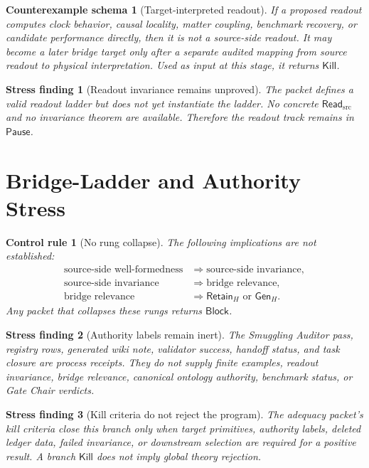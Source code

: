 \documentclass[11pt]{article}
\newcommand{\ReadSrc}{\mathsf{Read}_{\mathrm{src}}}
\newcommand{\RetainH}{\mathsf{Retain}_{H}}
\newcommand{\GenH}{\mathsf{Gen}_{H}}
\newcommand{\Block}{\mathsf{Block}}
\newcommand{\Pause}{\mathsf{Pause}}
\newcommand{\Kill}{\mathsf{Kill}}
\newtheorem{stressfinding}{Stress finding}
\newtheorem{counterexample}{Counterexample schema}
\newtheorem{controlrule}{Control rule}
\begin{document}
\begin{counterexample}[Target-interpreted readout]
If a proposed readout computes clock behavior, causal locality, matter
coupling, benchmark recovery, or candidate performance directly, then it
is not a source-side readout. It may become a later bridge target only
after a separate audited mapping from source readout to physical
interpretation. Used as input at this stage, it returns \(\Kill\).
\end{counterexample}

\begin{stressfinding}[Readout invariance remains unproved]
The packet defines a valid readout ladder but does not yet instantiate
the ladder. No concrete \(\ReadSrc\) and no invariance theorem are
available. Therefore the readout track remains in \(\Pause\).
\end{stressfinding}

\section{Bridge-Ladder and Authority Stress}

\begin{controlrule}[No rung collapse]
The following implications are not established:
\[
\begin{aligned}
    \text{source-side well-formedness} &\Longrightarrow
    \text{source-side invariance},\\
    \text{source-side invariance} &\Longrightarrow
    \text{bridge relevance},\\
    \text{bridge relevance} &\Longrightarrow
    \RetainH\text{ or }\GenH .
\end{aligned}
\]
Any packet that collapses these rungs returns \(\Block\).
\end{controlrule}

\begin{stressfinding}[Authority labels remain inert]
The Smuggling Auditor pass, registry rows, generated wiki note,
validator success, handoff status, and task closure are process
receipts. They do not supply finite examples, readout invariance,
bridge relevance, canonical ontology authority, benchmark status, or
Gate Chair verdicts.
\end{stressfinding}

\begin{stressfinding}[Kill criteria do not reject the program]
The adequacy packet's kill criteria close this branch only when target
primitives, authority labels, deleted ledger data, failed invariance, or
downstream selection are required for a positive result. A branch
\(\Kill\) does not imply global theory rejection.
\end{stressfinding}
\end{document}

